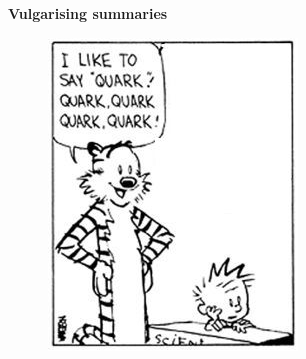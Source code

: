 \cleardoublepage\thispagestyle{empty}

\begin{center}
	\vspace*{10mm}
     
	\huge \textbf{Vulgarising summaries}

	\vspace{10mm}
\begin{figure}[th]
	\centering
	\includegraphics[width=0.5\linewidth]{./quark}
\end{figure}
\vspace{10mm}



\end{center}

\cleardoublepage
\setlength{\topmargin}{0mm}
\normalsize%